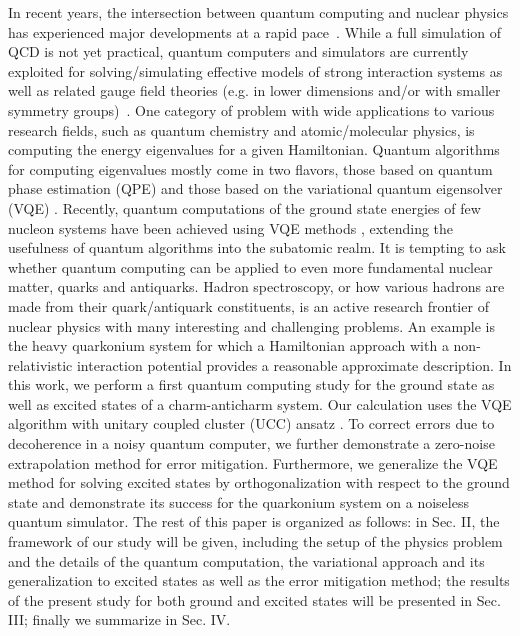 \documentclass[aps,10pt,superscriptaddress,floatfix,nofootinbib,notitlepage]{revtex4-1}
\begin{document}
In recent years, the intersection between quantum computing and nuclear physics has experienced major developments at a rapid pace~\cite{Cloet:2019wre,Zhang_2021,Kharzeev:2021nzh}. While a full simulation of QCD is not yet practical, quantum computers and simulators are currently exploited for  solving/simulating effective models of strong interaction systems as well as related gauge field  theories (e.g. in lower dimensions and/or with smaller symmetry groups)~\cite{Dumitrescu_2018,Lu_2019,Klco:2018kyo,Klco:2018zqz,Roggero:2018hrn,Lee:2019zze,Lamm:2019bik,Alexandru:2019nsa,Ciavarella:2021nmj,Atas_2021,Cohen_2021,Li:2021kcs,Kharzeev:2020kgc,Tu:2019ouv}. 
One category of problem with wide applications to various research fields, such as quantum chemistry and atomic/molecular physics, is computing the energy eigenvalues for a given Hamiltonian. Quantum algorithms for computing eigenvalues mostly come in two flavors, those based on quantum phase estimation (QPE) \cite{kitaev1995quantum,PhysRevLett.83.5162,OBrien_2019} and those based on the variational quantum eigensolver (VQE) \cite{Peruzzo_2014,McClean_2016}. Recently, quantum computations of the ground state energies of few nucleon systems have been achieved using VQE methods \cite{Dumitrescu_2018,Lu_2019}, extending the usefulness of quantum algorithms into the subatomic realm. It is tempting to ask whether quantum computing can be applied to even more fundamental nuclear matter, quarks and antiquarks. Hadron spectroscopy, or how various hadrons are made from their quark/antiquark constituents, is an active research frontier of nuclear physics with many interesting and challenging problems. An example is the heavy quarkonium system for which a Hamiltonian approach with a non-relativistic interaction potential provides a reasonable approximate description. In this work, we perform a first quantum computing study for the ground state as well as excited states of a charm-anticharm system. Our calculation uses the VQE algorithm with unitary coupled cluster (UCC) ansatz \cite{McClean_2016,Shen_2017}. To correct errors due to decoherence in a noisy quantum computer, we further demonstrate a zero-noise extrapolation method for error mitigation. Furthermore, we generalize the VQE method for solving excited states by orthogonalization  with respect to the ground state and demonstrate its success   for the quarkonium system  on a noiseless quantum simulator. The rest of this paper is organized as follows: in Sec. II, the framework of our study will be given, including   the setup of the physics problem and the details of the quantum computation, the variational approach and its generalization to excited states as well as the error mitigation method;   the results of the present study for both ground and excited states will be presented in Sec. III; finally we summarize in Sec. IV. 
\end{document}
